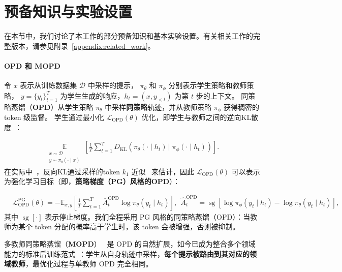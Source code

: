 \section{预备知识与实验设置}
在本节中，我们讨论了本工作的部分预备知识和基本实验设置。有关相关工作的完整版本，请参见附录~\ref{appendix:related_work}。

\paragraph{OPD 和 MOPD}
令 $x$ 表示从训练数据集 $\mathcal{D}$ 中采样的提示，
$\pi_{\theta}$ 和
$\pi_{\phi}$ 分别表示学生策略和教师策略，
$y=\{y_t\}^T_{t=1}$ 为学生生成的响应，$h_t=(x,y_{<t})$ 为第 $t$ 步的上下文。
同策略蒸馏（\textbf{OPD}）从学生策略 $\pi_{\theta}$ 中采样\textbf{同策略}轨迹，并从教师策略 $\pi_{\phi}$ 获得稠密的 token 级监督。
学生通过最小化 $\mathcal{L}_{\mathrm{OPD}}(\theta)$ 优化，即学生与教师之间的逆向KL散度~\citep{gu2024minillm}：

{
\begin{align*}
\mathop{\mathbb{E}}\limits_{\substack{
    x\sim\mathcal{D} \\
    y\sim\pi_{\theta}(\cdot\mid x)
}}
\left[
    \frac{1}{T}
    \sum_{t=1}^{T}
    D_{\mathrm{KL}}
    \left(
        \pi_{\theta}(\cdot\mid h_t)
        \,\Vert\,
        \pi_{\phi}(\cdot\mid h_t)
    \right)
\right].
\end{align*}
}
在实际中~\cite{coreteam2026mimov2flashtechnicalreport,glm5team2026glm5vibecodingagentic, kimiteam2026kimik3openfrontier}，反向KL通过采样的token $k_1$ 近似~\citep{joschuApproximatingDivergence} 来估计，因此
$\mathcal{L}_{\mathrm{OPD}}(\theta)$ 可以表示为强化学习目标（即，\textbf{策略梯度（PG）风格的OPD}）：

{
\begin{align*}
&\mathcal{L}^{\mathrm{PG}}_{\mathrm{OPD}}(\theta)
=
-
\mathbb{E}_{x,y}
\left[
    \frac{1}{T}
    \sum_{t=1}^{T}
    \bar{A}^{\mathrm{OPD}}_t
    \log\pi_{\theta}(y_t\mid h_t)
\right],
\ \ \widehat{A}^{\mathrm{OPD}}_t
=
\operatorname{sg}
\left[
    \log\pi_{\phi}(y_t\mid h_t)
    -
    \log\pi_{\theta}(y_t\mid h_t)
\right],
\end{align*}
}
其中 $\operatorname{sg}[\cdot]$ 表示停止梯度。我们全程采用 PG 风格的同策略蒸馏（OPD）：当教师为某个 token 分配的概率高于学生时，该 token 会被增强，否则被抑制。

多教师同策略蒸馏（\textbf{MOPD}）~\citep{ma2026mopd} 是 OPD 的自然扩展，如今已成为整合多个领域能力的标准后训练范式~\citep{coreteam2026mimov2flashtechnicalreport,kimiteam2026kimik3openfrontier,xu2026deepseek}：学生从自身轨迹中采样，\textbf{每个提示被路由到其对应的领域教师}，最优化过程与单教师 OPD 完全相同。

